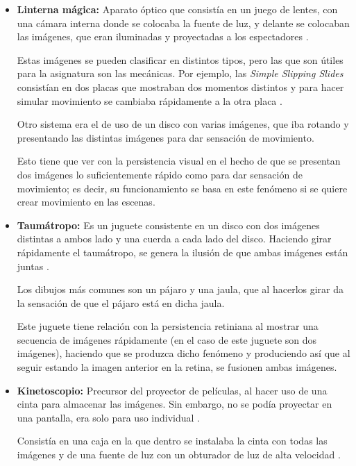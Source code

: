 \documentclass{article}
\begin{document}
\begin{itemize}
    \item \textbf{Linterna mágica: }Aparato óptico que consistía en un juego de lentes, con una cámara interna donde se colocaba la fuente de luz, y delante se colocaban las imágenes, que eran iluminadas y proyectadas a los espectadores \cite{magiclantern}.
    
    Estas imágenes se pueden clasificar en distintos tipos, pero las que son útiles para la asignatura son las mecánicas. Por ejemplo, las \textit{Simple Slipping Slides} consistían en dos placas que mostraban dos momentos distintos y para hacer simular movimiento se cambiaba rápidamente a la otra placa \cite{magiclantern}.

    Otro sistema era el de uso de un disco con varias imágenes, que iba rotando y presentando las distintas imágenes para dar sensación de movimiento.

    Esto tiene que ver con la persistencia visual en el hecho de que se presentan dos imágenes lo suficientemente rápido como para dar sensación de movimiento; es decir, su funcionamiento se basa en este fenómeno si se quiere crear movimiento en las escenas.

    \item \textbf{Taumátropo: }Es un juguete consistente en un disco con dos imágenes distintas a ambos lado y una cuerda a cada lado del disco. Haciendo girar rápidamente el taumátropo, se genera la ilusión de que ambas imágenes están juntas \cite{tauma}.
    
    Los dibujos más comunes son un pájaro y una jaula, que al hacerlos girar da la sensación de que el pájaro está en dicha jaula.

    Este juguete tiene relación con la persistencia retiniana al mostrar una secuencia de imágenes rápidamente (en el caso de este juguete son dos imágenes), haciendo que se produzca dicho fenómeno y produciendo así que al seguir estando la imagen anterior en la retina, se fusionen ambas imágenes.

    \item \textbf{Kinetoscopio: }Precursor del proyector de películas, al hacer uso de una cinta para almacenar las imágenes. Sin embargo, no se podía proyectar en una pantalla, era solo para uso individual \cite{kinet}.
    
    Consistía en una caja en la que dentro se instalaba la cinta con todas las imágenes y de una fuente de luz con un obturador de luz de alta velocidad \cite{kinet}.


\end{itemize}
\end{document}
